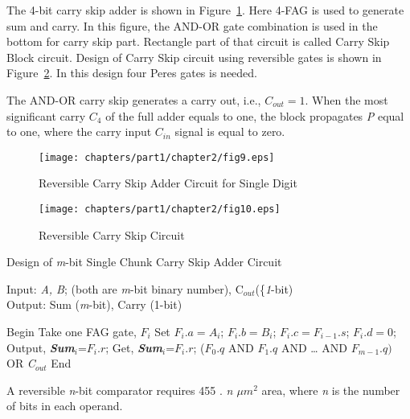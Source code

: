 The 4-bit carry skip adder is shown in Figure~\ref{fig:p1_c2_fig9}. Here 4-FAG is used to generate sum and carry. In this figure, the AND-OR gate combination is used in the bottom for carry skip part. Rectangle part of that circuit is called Carry Skip Block circuit. Design of Carry Skip circuit using reversible gates is shown in Figure~\ref{fig:p1_c2_fig10}. In this design four Peres gates is needed.

The AND-OR carry skip generates a carry out, i.e., $C_{out}=1$. When the most significant carry $C_4$
of the full adder equals to one, the block propagates \textit{P} equal to one, where the carry input
$C_{in}$ signal is equal to zero.

\begin{figure}[!tbh]
	\centering
	\texttt{[image: chapters/part1/chapter2/fig9.eps]}
	\caption{Reversible Carry Skip Adder Circuit for Single Digit}
	\label{fig:p1_c2_fig9}
\end{figure}



\begin{figure}[!tbh]
	\centering
	\texttt{[image: chapters/part1/chapter2/fig10.eps]}
	\caption{Reversible Carry Skip Circuit}
	\label{fig:p1_c2_fig10}
\end{figure}
\begin{algorithm}[!h]
	\caption{Design of {\it m}-bit Single Chunk Carry Skip Adder Circuit}
	\label{alg:part1_c2_alg3}
	Input: { {\it A, B}; (both are {\it m}-bit binary number), C${}_{out}$(\{\it1}-bit)\\
	Output: { { Sum ({\it m}-bit), Carry (1-bit)}}
	\begin{algorithmic}[1]
		
		\STATE Begin
		\STATE Take one FAG gate, $F{}_{i}$
		\STATE Set $F{}_{i}.a=A{}_{i}$; $F{}_{i}.b=B{}_{i}$; $F{}_{i}.c=F{}_{i-1}.s$; $F{}_{i}.d=0$;
		\STATE Output, {\bf {\it Sum${}_{i}$}}=$F{}_{i}.r$; 
		\STATE Get, {\bf {\it Sum${}_{i}$}}=$F{}_{i}.r$;
		\ENDFOR
		($F{}_{0}.q$ {AND} $F{}_{1}.q$ {AND }{\dots} {AND} $F{}_{m-1}.q)${ OR {\it C${}_{out}$}}
		\STATE End
	\end{algorithmic}
\end{algorithm}
\begin{property}\textnormal{
		A reversible {\it n}-bit comparator requires 455 ${.}$ {\it n $\mu m{}^{2}$} area, where {\it n} is the number of bits in each operand.}
\end{property}

